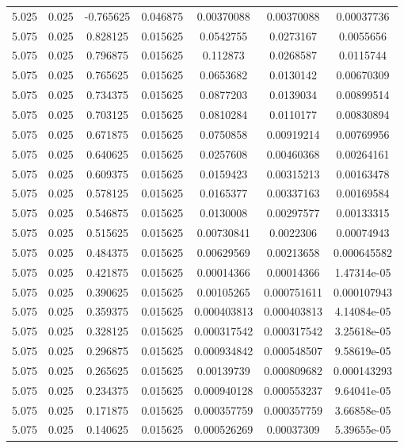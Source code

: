 \begin{flushleft}
\begin{longtable}{ccccccc}
5.025 & 0.025 & -0.765625 & 0.046875 & 0.00370088 & 0.00370088 & 0.00037736  \\ 
5.075 & 0.025 & 0.828125 & 0.015625 & 0.0542755 & 0.0273167 & 0.0055656  \\ 
5.075 & 0.025 & 0.796875 & 0.015625 & 0.112873 & 0.0268587 & 0.0115744  \\ 
5.075 & 0.025 & 0.765625 & 0.015625 & 0.0653682 & 0.0130142 & 0.00670309  \\ 
5.075 & 0.025 & 0.734375 & 0.015625 & 0.0877203 & 0.0139034 & 0.00899514  \\ 
5.075 & 0.025 & 0.703125 & 0.015625 & 0.0810284 & 0.0110177 & 0.00830894  \\ 
5.075 & 0.025 & 0.671875 & 0.015625 & 0.0750858 & 0.00919214 & 0.00769956  \\ 
5.075 & 0.025 & 0.640625 & 0.015625 & 0.0257608 & 0.00460368 & 0.00264161  \\ 
5.075 & 0.025 & 0.609375 & 0.015625 & 0.0159423 & 0.00315213 & 0.00163478  \\ 
5.075 & 0.025 & 0.578125 & 0.015625 & 0.0165377 & 0.00337163 & 0.00169584  \\ 
5.075 & 0.025 & 0.546875 & 0.015625 & 0.0130008 & 0.00297577 & 0.00133315  \\ 
5.075 & 0.025 & 0.515625 & 0.015625 & 0.00730841 & 0.0022306 & 0.00074943  \\ 
5.075 & 0.025 & 0.484375 & 0.015625 & 0.00629569 & 0.00213658 & 0.000645582  \\ 
5.075 & 0.025 & 0.421875 & 0.015625 & 0.00014366 & 0.00014366 & 1.47314e-05  \\ 
5.075 & 0.025 & 0.390625 & 0.015625 & 0.00105265 & 0.000751611 & 0.000107943  \\ 
5.075 & 0.025 & 0.359375 & 0.015625 & 0.000403813 & 0.000403813 & 4.14084e-05  \\ 
5.075 & 0.025 & 0.328125 & 0.015625 & 0.000317542 & 0.000317542 & 3.25618e-05  \\ 
5.075 & 0.025 & 0.296875 & 0.015625 & 0.000934842 & 0.000548507 & 9.58619e-05  \\ 
5.075 & 0.025 & 0.265625 & 0.015625 & 0.00139739 & 0.000809682 & 0.000143293  \\ 
5.075 & 0.025 & 0.234375 & 0.015625 & 0.000940128 & 0.000553237 & 9.64041e-05  \\ 
5.075 & 0.025 & 0.171875 & 0.015625 & 0.000357759 & 0.000357759 & 3.66858e-05  \\ 
5.075 & 0.025 & 0.140625 & 0.015625 & 0.000526269 & 0.00037309 & 5.39655e-05  \\ 

\end{longtable}
\end{flushleft}
